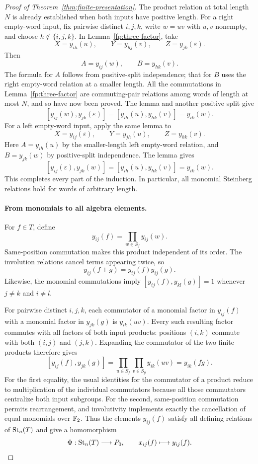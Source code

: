 \begin{proof}[Proof of Theorem~\ref{thm:finite-presentation}]
The product relation at total length $N$ is already established when
both inputs have positive length.  For a right empty-word input, fix
pairwise distinct $i,j,k$, write $w=uv$ with $u,v$ nonempty, and choose
$h\notin\{i,j,k\}$.  In Lemma~\ref{fp:three-factor}, take
\[
 X=y_{ih}(u),\qquad
 Y=y_{hj}(v),\qquad
 Z=y_{jk}(\varepsilon).
\]
Then
\[
 A=y_{ij}(w),\qquad B=y_{hk}(v).
\]
The formula for $A$ follows from positive-split independence; that for
$B$ uses the right empty-word relation at a smaller length.  All the
commutations in Lemma~\ref{fp:three-factor} are commuting-pair
relations among words of length at most $N$, and so have now been
proved.  The lemma and another positive split give
\[
 [y_{ij}(w),y_{jk}(\varepsilon)]
 =[y_{ih}(u),y_{hk}(v)]
 =y_{ik}(w).
\]
For a left empty-word input, apply the same lemma to
\[
 X=y_{ij}(\varepsilon),\qquad
 Y=y_{jh}(u),\qquad
 Z=y_{hk}(v).
\]
Here $A=y_{ih}(u)$ by the smaller-length left empty-word relation,
and $B=y_{jk}(w)$ by positive-split independence.  The lemma gives
\[
 [y_{ij}(\varepsilon),y_{jk}(w)]
 =[y_{ih}(u),y_{hk}(v)]
 =y_{ik}(w).
\]
This completes every part of the induction.  In particular, all
monomial Steinberg relations hold for words of arbitrary length.

\paragraph{From monomials to all algebra elements.}
For $f\in T$, define
\[
 y_{ij}(f)=\prod_{w\in S_f}y_{ij}(w).
\]
Same-position commutation makes this product independent of its order.
The involution relations cancel terms appearing twice, so
\[
 y_{ij}(f+g)=y_{ij}(f)y_{ij}(g).
\]
Likewise, the monomial commutations imply
$[y_{ij}(f),y_{kl}(g)]=1$ whenever $j\neq k$ and $i\neq l$.

For pairwise distinct $i,j,k$, each commutator of a monomial factor in
$y_{ij}(f)$ with a monomial factor in $y_{jk}(g)$ is
$y_{ik}(uv)$.  Every such resulting factor commutes with all factors of
both input products: positions $(i,k)$ commute with both $(i,j)$ and
$(j,k)$.  Expanding the commutator of the two finite products therefore
gives
\[
 [y_{ij}(f),y_{jk}(g)]
 =\prod_{u\in S_f}\prod_{v\in S_g}y_{ik}(uv)
 =y_{ik}(fg).
\]
For the first equality, the usual identities for the commutator of a
product reduce to multiplication of the individual commutators because
all those commutators centralize both input subgroups.  For the second,
same-position commutation permits rearrangement, and involutivity
implements exactly the cancellation of equal monomials over $\mathbb F_2$.
Thus the elements $y_{ij}(f)$ satisfy all defining relations of
$\operatorname{St}_n(T)$ and give a homomorphism
\[
 \Phi:\operatorname{St}_n(T)\longrightarrow P_0,
 \qquad x_{ij}(f)\longmapsto y_{ij}(f).
\]


\end{proof}
